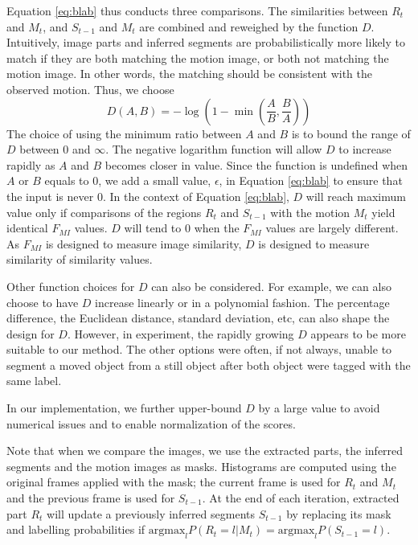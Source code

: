 \documentclass{article}
\begin{document}
Equation \ref{eq:blab} thus conducts three comparisons. The similarities between $R_t$ and $M_t$, and $S_{t-1}$ and $M_t$ are combined and reweighed by the function $D$. Intuitively, image parts and inferred segments are probabilistically more likely to match if they are both matching the motion image, or both not matching the motion image. In other words, the matching should be consistent with the observed motion. Thus, we choose
\begin{equation}
	D(A,B) = -\log\left(1-\min\left(\frac{A}{B}, \frac{B}{A}\right)\right)
\end{equation}
The choice of using the minimum ratio between $A$ and $B$ is to bound the range of $D$ between $0$ and $\infty$. The negative logarithm function will allow $D$ to increase rapidly as $A$ and $B$ becomes closer in value. Since the function is undefined when $A$ or $B$ equals to 0, we add a small value, $\epsilon$, in Equation \ref{eq:blab} to ensure that the input is never 0. In the context of Equation \ref{eq:blab}, $D$ will reach maximum value only if comparisons of the regions $R_t$ and $S_{t-1}$ with the motion $M_t$ yield identical $F_{MI}$ values. $D$ will tend to 0 when the $F_{MI}$ values are largely different. As $F_{MI}$ is designed to measure image similarity, $D$ is designed to measure similarity of similarity values. 

Other function choices for $D$ can also be considered. For example, we can also choose to have $D$ increase linearly or in a polynomial fashion. The percentage difference, the Euclidean distance, standard deviation, etc, can also shape the design for $D$. However, in experiment, the rapidly growing $D$ appears to be more suitable to our method. The other options were often, if not always, unable to segment a moved object from a still object after both object were tagged with the same label.

In our implementation, we further upper-bound $D$ by a large value to avoid numerical issues and to enable normalization of the scores. 

Note that when we compare the images, we use the extracted parts, the inferred segments and the motion images as masks. Histograms are computed using the original frames applied with the mask; the current frame is used for $R_t$ and $M_t$ and the previous frame is used for $S_{t-1}$. At the end of each iteration, extracted part $R_t$ will update a previously inferred segments $S_{t-1}$ by replacing its mask and labelling probabilities if $\mbox{argmax}_l P(R_t = l|M_t) = \mbox{argmax}_l P(S_{t-1} = l)$.
\end{document}
